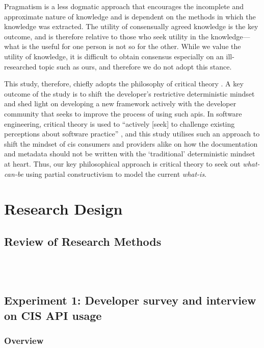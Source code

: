 Pragmatism is a less dogmatic approach that encourages the incomplete and approximate nature of knowledge and is dependent on the methods in which the knowledge was extracted. The utility of consensually agreed knowledge is the key outcome, and is therefore relative to those who seek utility in the knowledge---what is the useful for one person is not so for the other. While we value the utility of knowledge, it is difficult to obtain consensus especially on an ill-researched topic such as ours, and therefore we do not adopt this stance.

This study, therefore, chiefly adopts the philosophy of critical theory . A key outcome of the study is to shift the developer's restrictive deterministic mindset and shed light on developing a new framework actively with the developer community that seeks to improve the process of using such \glspl{api}. In software engineering, critical theory is used to ``actively [seek] to challenge existing perceptions about software practice'' \citep{Easterbrook:2007ws}, and this study utilises such an approach to shift the mindset of \gls{cis} consumers and providers alike on how the documentation and metadata should not be written with the `traditional' deterministic mindset at heart. Thus, our key philosophical approach is critical theory to seek out \textit{what-can-be} using  partial constructivism to model the current \textit{what-is}.

\section{Research Design}

\subsection{Review of Research Methods}

\\
\\

\subsection{Experiment 1: Developer survey and interview on CIS API usage}

\subsubsection{Overview}

